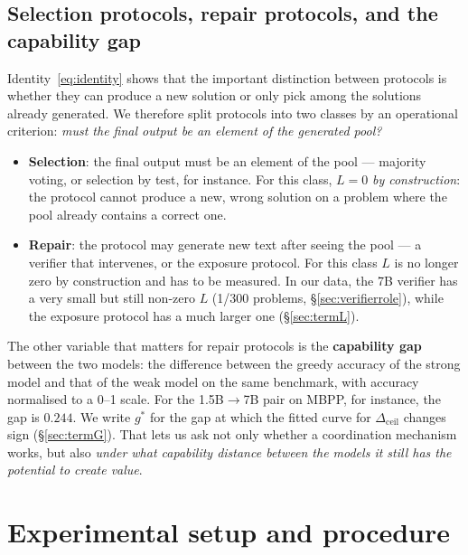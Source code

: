 \documentclass[11pt,a4paper]{article}
\newcommand{\dceil}{\Delta_{\mathrm{ceil}}}
\begin{document}
\subsection{Selection protocols, repair protocols, and the capability gap}\label{sec:protocols}

Identity~\eqref{eq:identity} shows that the important distinction between protocols is whether they can
produce a new solution or only pick among the solutions already generated. We therefore split
protocols into two classes by an operational criterion: \emph{must the final output be an element
of the generated pool?}

\begin{itemize}\itemsep1pt
\item \textbf{Selection}: the final output must be an element of the pool --- majority voting, or
      selection by test, for instance. For this class, $L=0$ \emph{by construction}: the protocol
      cannot produce a new, wrong solution on a problem where the pool already contains a correct
      one.
\item \textbf{Repair}: the protocol may generate new text after seeing the pool --- a verifier
      that intervenes, or the exposure protocol. For this class $L$ is no longer zero by
      construction and has to be measured. In our data, the 7B verifier has a very small but
      still non-zero $L$ (1/300 problems, \S\ref{sec:verifierrole}), while the exposure protocol has a
      much larger one (\S\ref{sec:termL}).
\end{itemize}

The other variable that matters for repair protocols is the \textbf{capability gap} between the two
models: the difference between the greedy accuracy of the strong model and that of the weak model
on the same benchmark, with accuracy normalised to a 0--1 scale. For the 1.5B$\to$7B pair on MBPP,
for instance, the gap is $0.244$. We write $g^\ast$ for the gap at which the fitted curve for
$\dceil$ changes sign (\S\ref{sec:termG}). That lets us ask not only whether a coordination
mechanism works, but also \emph{under what capability distance between the models it still has the
potential to create value}.


\section{Experimental setup and procedure}\label{sec:setup}
\end{document}
